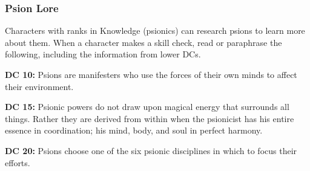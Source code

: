\subsubsection{Psion Lore}

Characters with ranks in Knowledge (psionics) can research psions to learn more about them. When a character makes a skill check, read or paraphrase the following, including the information from lower DCs.

\textbf{DC 10:} Psions are manifesters who use the forces of their own minds to affect their environment.

\textbf{DC 15:} Psionic powers do not draw upon magical energy that surrounds all things. Rather they are derived from within when the psionicist has his entire essence in coordination; his mind, body, and soul in perfect harmony.

\textbf{DC 20:} Psions choose one of the six psionic disciplines in which to focus their efforts.
